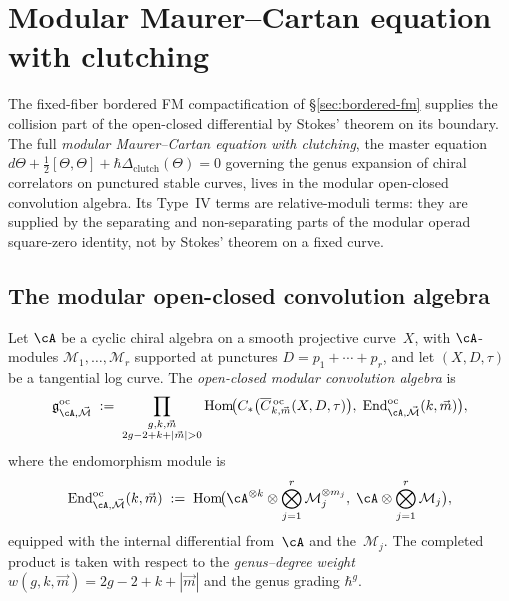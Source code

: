 \section{Modular Maurer--Cartan equation with clutching}
\label{sec:modular-mc-clutching}

The fixed-fiber bordered FM compactification of
\S\ref{sec:bordered-fm} supplies the collision part of the
open-closed differential by Stokes' theorem on its boundary. The
full \emph{modular Maurer--Cartan equation with clutching}, the master
equation
$d\Theta + \tfrac{1}{2}[\Theta, \Theta]
+ \hbar\Delta_{\mathrm{clutch}}(\Theta) = 0$
governing the genus expansion of chiral correlators on
punctured stable curves, lives in the modular open-closed convolution
algebra. Its Type~IV terms are relative-moduli terms: they are supplied
by the separating and non-separating parts of the modular operad
square-zero identity, not by Stokes' theorem on a fixed curve.

\subsection{The modular open-closed convolution algebra}
\label{subsec:modular-oc-convolution}

\begin{definition}
\label{def:oc-modular-convolution}
Let $\cA$ be a cyclic chiral algebra on a smooth projective
curve~$X$, with $\cA$-modules
$\mathcal{M}_1, \ldots, \mathcal{M}_r$ supported at punctures
$D = p_1 + \cdots + p_r$, and let
$(X, D, \tau)$ be a tangential log curve. The \emph{open-closed
modular convolution algebra} is
\begin{equation}\label{eq:oc-convolution}
\mathfrak{g}^{\mathrm{oc}}_{\cA, \vec{\mathcal{M}}}
\;:=\;
\prod_{\substack{g, k, \vec{m} \\ 2g - 2 + k + |\vec{m}| > 0}}
\operatorname{Hom}\!\bigl(
C_*\bigl(
\overline{C}{}^{\,\mathrm{oc}}_{k,\vec{m}}(X, D, \tau)
\bigr),\;
\operatorname{End}^{\mathrm{oc}}_{\cA, \vec{\mathcal{M}}}
(k, \vec{m})
\bigr),
\end{equation}
where the endomorphism module is
\begin{equation}\label{eq:oc-endomorphism}
\operatorname{End}^{\mathrm{oc}}_{\cA, \vec{\mathcal{M}}}
(k, \vec{m})
\;:=\;
\operatorname{Hom}\!\bigl(
\cA^{\otimes k}
\otimes
\bigotimes_{j=1}^{r} \mathcal{M}_j^{\otimes m_j},\;
\cA \otimes \bigotimes_{j=1}^r \mathcal{M}_j
\bigr),
\end{equation}
equipped with the internal differential from~$\cA$ and
the~$\mathcal{M}_j$. The completed product is taken with respect
to the \emph{genus--degree weight}
$w(g, k, \vec{m}) = 2g - 2 + k + |\vec{m}|$
and the genus grading $\hbar^g$.
\end{definition}

